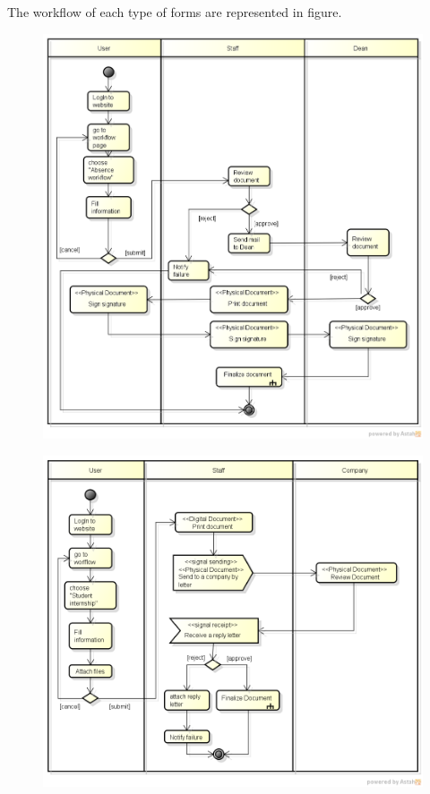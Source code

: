 The workflow of each type of forms are represented in figure.
\begin{figure}
	\includegraphics[scale=0.5]{res/Methodology/absence}
\end{figure}

\begin{figure}
	\includegraphics[scale=0.5]{res/Methodology/student_internship}
\end{figure}

